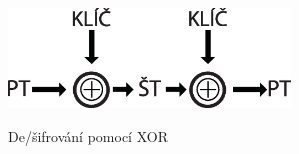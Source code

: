 \begin{figure}[!ht]
    \caption{De/šifrování pomocí XOR}
    \centering
    \includegraphics[width=75mm,scale=0.5]{Figures/obrazky/pt-st-pt-xorsifra.eps}
    \label{fig:XorSifrovani}
\end{figure}
    
 
 
 

